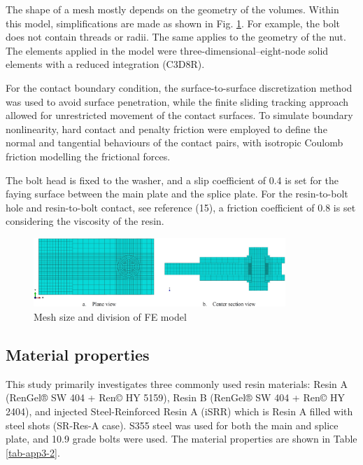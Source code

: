 The shape of a mesh mostly depends on the geometry of the volumes. Within this model, simplifications are made as shown in Fig. \ref{fig-mesh-div-RIBJ}. For example, the bolt does not contain threads or radii. The same applies to the geometry of the nut. The elements applied in the model were three-dimensional--eight-node solid elements with a reduced integration (C3D8R). 

For the contact boundary condition, the surface-to-surface discretization method was used to avoid surface penetration, while the finite sliding tracking approach allowed for unrestricted movement of the contact surfaces. To simulate boundary nonlinearity, hard contact and penalty friction were employed to define the normal and tangential behaviours of the contact pairs, with isotropic Coulomb friction modelling the frictional forces.

The bolt head is fixed to the washer, and a slip coefficient of 0.4 is set for the faying surface between the main plate and the splice plate. For the resin-to-bolt hole and resin-to-bolt contact, see reference (15), a friction coefficient of 0.8 is set considering the viscosity of the resin.

\begin{figure}
    \centering
    \includegraphics[width=0.85\textwidth]{imgs/app3/mesh-div-RIBJ.png}
    \caption{Mesh size and division of FE model}
    \label{fig-mesh-div-RIBJ}
\end{figure}

\subsection{Material properties}

This study primarily investigates three commonly used resin materials: Resin A (RenGel® SW 404 + Ren© HY 5159), Resin B (RenGel® SW 404 + Ren© HY 2404), and injected Steel-Reinforced Resin A (\ac{iSRR}) which is Resin A filled with steel shots (SR-Res-A case). S355 steel was used for both the main and splice plate, and 10.9 grade bolts were used. The material properties are shown in Table \ref{tab-app3-2}.

